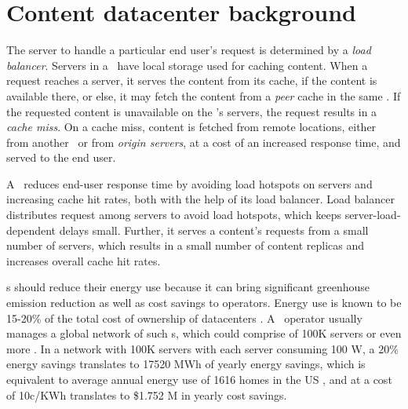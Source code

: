 
\section{Content datacenter background}
\label{sec:shrink-background}


The server to handle a particular end user's request is determined by a \emph{load balancer}. Servers in a \cdc\ have local storage used for caching content.  When a request reaches a server, it serves the content from its cache, if the content is available there, or else, it may fetch the content from a \emph{peer} cache in the same \cdc. If the requested content is unavailable on the \cdc's servers, the request results in a \emph{cache miss}. On a cache miss, content is fetched from remote locations, either from another \cdc\ or from \emph{origin servers}, at a cost of an increased response time, and served to the end user.


A  \cdc\ reduces end-user response time by avoiding load hotspots on servers and increasing cache hit rates, both with the help of its load balancer. Load balancer distributes request among servers to avoid load hotspots, which keeps server-load-dependent delays small. Further, it serves a content's requests from a small number of servers, which results in a small number of content replicas and increases overall cache hit rates.


\cdc s should reduce their energy use because it can bring significant greenhouse emission reduction as well as cost savings to operators. Energy use is known to be 15-20\% of the total cost of ownership of datacenters \cite{GreenbergCost, rasmussen2011determining, power-cost}. A \cdc\ operator usually manages a global network of such \cdc s, which could comprise of 100K servers or even more \cite{akamai-facts}. In a network with 100K servers with each server consuming 100 W,  a 20\% energy savings translates to 17520 MWh of yearly energy savings, which is equivalent to average annual energy use of 1616 homes in the US \cite{eia}, and at a cost of 10c/KWh translates to \$1.752 M in yearly cost savings.

